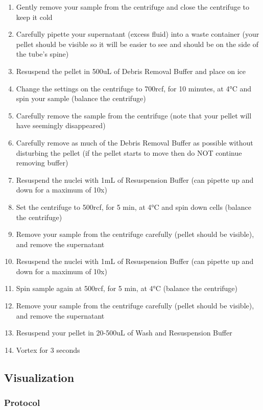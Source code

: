\documentclass[
]{article}
\begin{document}
\begin{enumerate}
\item
  Gently remove your sample from the centrifuge and close the centrifuge
  to keep it cold
\item
  Carefully pipette your supernatant (excess fluid) into a waste
  container (your pellet should be visible so it will be easier to see
  and should be on the side of the tube's spine)
\item
  Resuspend the pellet in 500uL of Debris Removal Buffer and place on
  ice
\item
  Change the settings on the centrifuge to 700rcf, for 10 minutes, at
  4°C and spin your sample (balance the centrifuge)
\item
  Carefully remove the sample from the centrifuge (note that your pellet
  will have seemingly disappeared)
\item
  Carefully remove as much of the Debris Removal Buffer as possible
  without disturbing the pellet (if the pellet starts to move then do
  NOT continue removing buffer)
\item
  Resuspend the nuclei with 1mL of Resuspension Buffer (can pipette up
  and down for a maximum of 10x)
\item
  Set the centrifuge to 500rcf, for 5 min, at 4°C and spin down cells
  (balance the centrifuge)
\item
  Remove your sample from the centrifuge carefully (pellet should be
  visible), and remove the supernatant
\item
  Resuspend the nuclei with 1mL of Resuspension Buffer (can pipette up
  and down for a maximum of 10x)
\item
  Spin sample again at 500rcf, for 5 min, at 4°C (balance the
  centrifuge)
\item
  Remove your sample from the centrifuge carefully (pellet should be
  visible), and remove the supernatant
\item
  Resuspend your pellet in 20-500uL of Wash and Resuspension Buffer
\item
  Vortex for 3 seconds
\end{enumerate}

\subsection{Visualization}\label{visualization}

\subsubsection{Protocol}\label{protocol}
\end{document}
